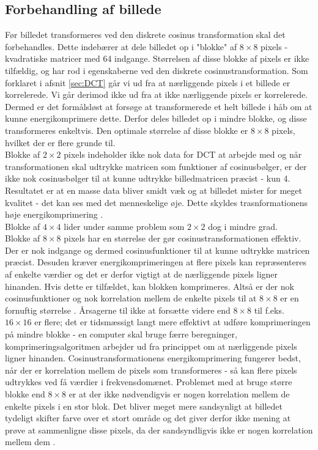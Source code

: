 \subsection{Forbehandling af billede}
Før billedet transformeres ved den diskrete cosinus transformation skal det forbehandles. Dette indebærer at dele billedet op i "blokke" af $8\times8$ pixels - kvadratiske matricer med 64 indgange. Størrelsen af disse blokke af pixels er ikke tilfældig, og har rod i egenskaberne ved den diskrete cosinustransformation. Som forklaret i afsnit \vref{sec:DCT} går vi ud fra at nærliggende pixels i et billede er korrelerede. Vi går derimod ikke ud fra at ikke nærliggende pixels er korrelerede. Dermed er det formålsløst at forsøge at transformerede et helt billede i håb om at kunne energikomprimere dette. Derfor deles billedet op i mindre blokke, og disse transformeres enkeltvis. Den optimale størrelse af disse blokke er $8\times8$ pixels, hvilket der er flere grunde til.\\
Blokke af $2\times2$ pixels indeholder ikke nok data for DCT at arbejde med og når transformationen skal udtrykke matricen som funktioner af cosinusbølger, er der ikke nok cosinusbølger til at kunne udtrykke billedmatricen præcist - kun 4. Resultatet er at en masse data bliver smidt væk og at billedet mister for meget kvalitet - det kan ses med det menneskelige øje. Dette skyldes trasnformationens høje energikomprimering \citep{guillermo_sapiro}.\\
Blokke af $4\times4$ lider under samme problem som $2\times2$ dog i mindre grad.\\
Blokke af $8\times8$ pixels har en størrelse der gør cosinustransformationen effektiv. Der er nok indgange og dermed cosinusfunktioner til at kunne udtrykke matricen præcist. Desuden kræver energikomprimeringen at flere pixels kan repræsenteres af enkelte værdier og det er derfor vigtigt at de nærliggende pixels ligner hinanden. Hvis dette er tilfældet, kan blokken komprimeres. Altså er der nok cosinusfunktioner og nok korrelation mellem de enkelte pixels til at $8\times8$ er en fornuftig størrelse \citep{guillermo_sapiro}.
Årsagerne til ikke at forsætte videre end $8\times8$ til f.eks. $16\times16$ er flere; det er tidsmæssigt langt mere effektivt at udføre komprimeringen på mindre blokke - en computer skal bruge færre beregninger, komprimeringsalgoritmen arbejder ud fra princippet om at nærliggende pixels ligner hinanden. Cosinustransformationens energikomprimering fungerer bedst, når der er korrelation mellem de pixels som transformeres - så kan flere pixels udtrykkes ved få værdier i frekvensdomænet. Problemet med at bruge større blokke end $8\times8$ er at der ikke nødvendigvis er nogen korrelation mellem de enkelte pixels i en stor blok. Det bliver meget mere sandsynligt at billedet tydeligt skifter farve over et stort område og det giver derfor ikke mening at prøve at sammenligne disse pixels, da der sandsyndligvis ikke er nogen korrelation mellem dem \citep{guillermo_sapiro}.\\
